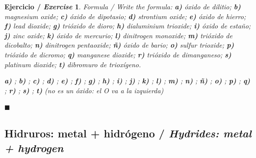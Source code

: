 \documentclass[12pt]{article}
\theoremstyle{mygreennumbox}
\newtheorem{ejercicioT}{Ejercicio / \textit{Exercise}}[section]
\newenvironment{exercise}{\begin{eBoxmygreen}\begin{ejercicioT}}{\hfill{\color{mygreen}\tiny\ensuremath{\blacksquare}}\end{ejercicioT}\end{eBoxmygreen}}
\newcommand{\en}[1]{\textit{#1}}
\begin{document}
\begin{exercise}
    Formula / \en{Write the formula}: \textbf{a)} óxido de dilitio; \textbf{b)} \en{magnesium oxide}; \textbf{c)} óxido de dipotasio; \textbf{d)} \en{strontium oxide}; \textbf{e)} óxido de hierro; \textbf{f)} \en{lead dioxide}; \textbf{g)} trióxido de dioro; \textbf{h)} \en{dialuminium trioxide}; \textbf{i)} óxido de estaño; \textbf{j)} \en{zinc oxide}; \textbf{k)} óxido de mercurio; \textbf{l)} \en{dinitrogen monoxide}; \textbf{m)} trióxido de dicobalto; \textbf{n)} \en{dinitrogen pentaoxide}; \textbf{ñ)} óxido de bario; \textbf{o)} \en{sulfur trioxide}; \textbf{p)} trióxido de dicromo; \textbf{q)} \en{manganese dioxide}; \textbf{r)} trióxido de dimanganeso; \textbf{s)} \en{platinum dioxide}; \textbf{t)} dibromuro de trioxígeno.
    \begin{solu}
        \textbf{a)} \textcolor{red}{}; \textbf{b)} \textcolor{red}{}; \textbf{c)} \textcolor{red}{}; \textbf{d)} \textcolor{red}{}; \textbf{e)} \textcolor{red}{}; \textbf{f)} \textcolor{red}{}; \textbf{g)} \textcolor{red}{}; \textbf{h)} \textcolor{red}{}; \textbf{i)} \textcolor{red}{}; \textbf{j)} \textcolor{red}{}; \textbf{k)} \textcolor{red}{}; \textbf{l)} \textcolor{red}{}; \textbf{m)} \textcolor{red}{}; \textbf{n)} \textcolor{red}{}; \textbf{ñ)} \textcolor{red}{}; \textbf{o)} \textcolor{red}{}; \textbf{p)} \textcolor{red}{}; \textbf{q)} \textcolor{red}{}; \textbf{r)} \textcolor{red}{}; \textbf{s)} \textcolor{red}{}; \textbf{t)} \textcolor{red}{} (no es un óxido: el O va a la izquierda)
    \end{solu}
\end{exercise}

\subsection{Hidruros: metal + hidrógeno / \en{Hydrides: metal + hydrogen}}
\end{document}
